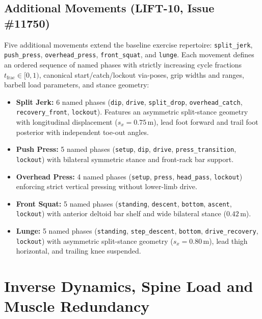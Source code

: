 \documentclass[11pt,a4paper]{article}
\begin{document}
\subsection{Additional Movements (LIFT-10, Issue \#11750)}
Five additional movements extend the baseline exercise repertoire: \texttt{split\_jerk},
\texttt{push\_press}, \texttt{overhead\_press}, \texttt{front\_squat}, and \texttt{lunge}.
Each movement defines an ordered sequence of named phases with strictly increasing
cycle fractions $t_{\text{frac}} \in [0, 1)$, canonical start/catch/lockout via-poses,
grip widths and ranges, barbell load parameters, and stance geometry:
\begin{itemize}[noitemsep]
\item \textbf{Split Jerk:} 6 named phases (\texttt{dip}, \texttt{drive}, \texttt{split\_drop},
  \texttt{overhead\_catch}, \texttt{recovery\_front}, \texttt{lockout}). Features an asymmetric
  split-stance geometry with longitudinal displacement ($s_x = 0.75\,\text{m}$), lead foot forward
  and trail foot posterior with independent toe-out angles.
\item \textbf{Push Press:} 5 named phases (\texttt{setup}, \texttt{dip}, \texttt{drive},
  \texttt{press\_transition}, \texttt{lockout}) with bilateral symmetric stance and front-rack bar support.
\item \textbf{Overhead Press:} 4 named phases (\texttt{setup}, \texttt{press}, \texttt{head\_pass},
  \texttt{lockout}) enforcing strict vertical pressing without lower-limb drive.
\item \textbf{Front Squat:} 5 named phases (\texttt{standing}, \texttt{descent}, \texttt{bottom},
  \texttt{ascent}, \texttt{lockout}) with anterior deltoid bar shelf and wide bilateral stance ($0.42\,\text{m}$).
\item \textbf{Lunge:} 5 named phases (\texttt{standing}, \texttt{step\_descent}, \texttt{bottom},
  \texttt{drive\_recovery}, \texttt{lockout}) with asymmetric split-stance geometry ($s_x = 0.80\,\text{m}$),
  lead thigh horizontal, and trailing knee suspended.
\end{itemize}

\section{Inverse Dynamics, Spine Load and Muscle Redundancy}
\end{document}
